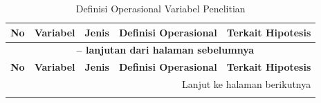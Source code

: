 \begin{longtable}{|c|>{\raggedright\arraybackslash}p{3cm}|c|>{\raggedright\arraybackslash}p{5cm}|>{\centering\arraybackslash}p{3cm}|}
\caption{Definisi Operasional Variabel Penelitian}
\label{tab:definisi-operasional} \\
\hline
\textbf{No} & \textbf{Variabel} & \textbf{Jenis} & \textbf{Definisi Operasional} & \textbf{Terkait Hipotesis} \\
\hline
\endfirsthead

\multicolumn{5}{c}{{\bfseries \tablename\ \thetable{} -- lanjutan dari halaman sebelumnya}} \\
\hline
\textbf{No} & \textbf{Variabel} & \textbf{Jenis} & \textbf{Definisi Operasional} & \textbf{Terkait Hipotesis} \\
\hline
\endhead

\hline
\multicolumn{5}{r}{Lanjut ke halaman berikutnya} \\
\endfoot

\hline
\endlastfoot


\end{longtable}
